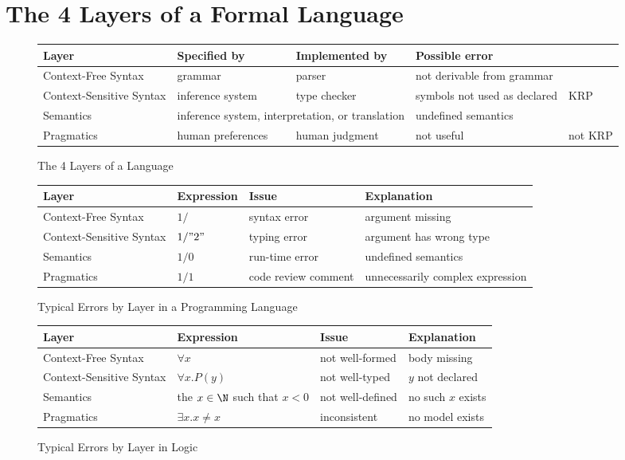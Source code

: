 \section{The 4 Layers of a Formal Language}

\begin{figure}[hbt]
\begin{tabular}{l|lll|l}
Layer & Specified by & Implemented by & Possible error \\\hline
Context-Free Syntax & grammar & parser & not derivable from grammar & \\
Context-Sensitive Syntax & inference system & type checker & symbols not used as declared & KRP \\
Semantics & \multicolumn{2}{l}{inference system, interpretation, or translation} & undefined semantics & \\
\hline
Pragmatics & human preferences & human judgment & not useful & not KRP \\
\end{tabular}
\caption{The 4 Layers of a Language}\label{fig:layers}
\end{figure}

\begin{figure}[hbt]
\begin{tabular}{l|lll}
Layer & Expression & Issue & Explanation \\\hline
Context-Free Syntax & $1/$ & syntax error & argument missing\\
Context-Sensitive Syntax & $1/"2"$ & typing error & argument has wrong type\\
Semantics & $1/0$ & run-time error & undefined semantics \\
Pragmatics & $1/1$ & code review comment & unnecessarily complex expression \\
\end{tabular}
\caption{Typical Errors by Layer in a Programming Language}\label{fig:errors-comp}
\end{figure}

\begin{figure}[hbt]
\begin{tabular}{l|lll}
Layer & Expression & Issue & Explanation \\\hline
Context-Free Syntax & $\forall x$ & not well-formed & body missing\\
Context-Sensitive Syntax & $\forall x.P(y)$ & not well-typed & $y$ not declared\\
Semantics & the $x\in \N$ such that $x<0$ & not well-defined & no such $x$ exists \\
Pragmatics & $\exists x.x\neq x$ & inconsistent & no model exists\\
\end{tabular}
\caption{Typical Errors by Layer in Logic}\label{fig:errors-ded}
\end{figure}

